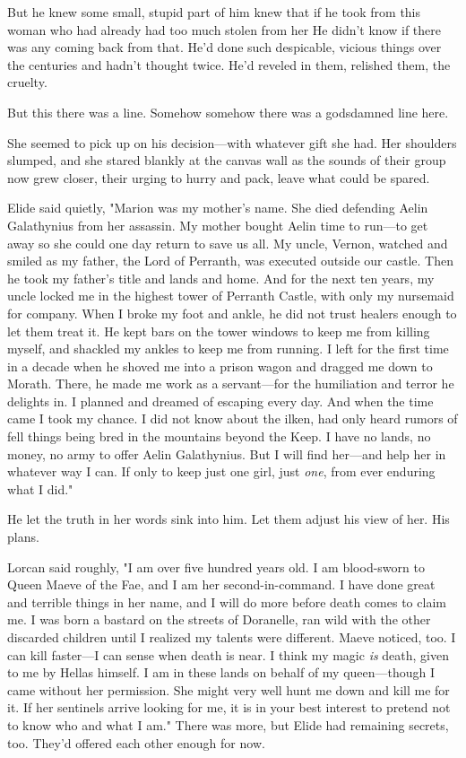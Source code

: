 But he knew  some small, stupid part of him knew that if he took from this woman who had already had too much stolen from her  He didn't know if there was any coming back from that. He'd done such despicable, vicious things over the centuries and hadn't thought twice. He'd reveled in them, relished them, the cruelty.

But this  there was a line. Somehow  somehow there was a godsdamned line here.

She seemed to pick up on his decision---with whatever gift she had. Her shoulders slumped, and she stared blankly at the canvas wall as the sounds of their group now grew closer, their urging to hurry and pack, leave what could be spared.

Elide said quietly, "Marion was my mother's name. She died defending Aelin Galathynius from her assassin. My mother bought Aelin time to run---to get away so she could one day return to save us all. My uncle, Vernon, watched and smiled as my father, the Lord of Perranth, was executed outside our castle. Then he took my father's title and lands and home. And for the next ten years, my uncle locked me in the highest tower of Perranth Castle, with only my nursemaid for company. When I broke my foot and ankle, he did not trust healers enough to let them treat it. He kept bars on the tower windows to keep me from killing myself, and shackled my ankles to keep me from running. I left for the first time in a decade when he shoved me into a prison wagon and dragged me down to Morath. There, he made me work as a servant---for the humiliation and terror he delights in. I planned and dreamed of escaping every day. And when the time came  I took my chance. I did not know about the ilken, had only heard rumors of fell things being bred in the mountains beyond the Keep. I have no lands, no money, no army to offer Aelin Galathynius. But I will find her---and help her in whatever way I can. If only to keep just one girl, just \emph{one}, from ever enduring what I did."

He let the truth in her words sink into him. Let them adjust his view of her. His  plans.

Lorcan said roughly, "I am over five hundred years old. I am blood-sworn to Queen Maeve of the Fae, and I am her second-in-command. I have done great and terrible things in her name, and I will do more before death comes to claim me. I was born a bastard on the streets of Doranelle, ran wild with the other discarded children until I realized my talents were different. Maeve noticed, too. I can kill faster---I can sense when death is near. I think my magic \emph{is} death, given to me by Hellas himself. I am in these lands on behalf of my queen---though I came without her permission. She might very well hunt me down and kill me for it. If her sentinels arrive looking for me, it is in your best interest to pretend not to know who and what I am." There was more, but
 Elide had remaining secrets, too. They'd offered each other enough for now.

